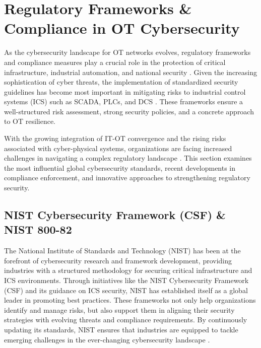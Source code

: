 \section{Regulatory Frameworks \& Compliance in OT Cybersecurity}
\label{sec:RegFrameworks}
As the cybersecurity landscape for OT networks evolves, regulatory frameworks and compliance measures play a crucial role in the protection of critical infrastructure, industrial automation, and national security \cite{bellamkonda2020cybersecurity}. Given the increasing sophistication of cyber threats, the implementation of standardized security guidelines has become most important in mitigating risks to industrial control systems (ICS) such as SCADA, PLCs, and DCS \cite{fortunato2020risk}. These frameworks ensure a well-structured risk assessment, strong security policies, and a concrete approach to OT resilience.

With the growing integration of IT-OT convergence and the rising risks associated with cyber-physical systems, organizations are facing increased challenges in navigating a complex regulatory landscape \cite{qiu2020edge}. This section examines the most influential global cybersecurity standards, recent developments in compliance enforcement, and innovative approaches to strengthening regulatory security.

\subsection {NIST Cybersecurity Framework (CSF) \& NIST 800-82} 
The National Institute of Standards and Technology (NIST) has been at the forefront of cybersecurity research and framework development, providing industries with a structured methodology for securing critical infrastructure and ICS environments. Through initiatives like the NIST Cybersecurity Framework (CSF) and its guidance on ICS security, NIST has established itself as a global leader in promoting best practices. These frameworks not only help organizations identify and manage risks, but also support them in aligning their security strategies with evolving threats and compliance requirements. By continuously updating its standards, NIST ensures that industries are equipped to tackle emerging challenges in the ever-changing cybersecurity landscape \cite{lanz2024updated} \cite{hatinen2024evolution}.

